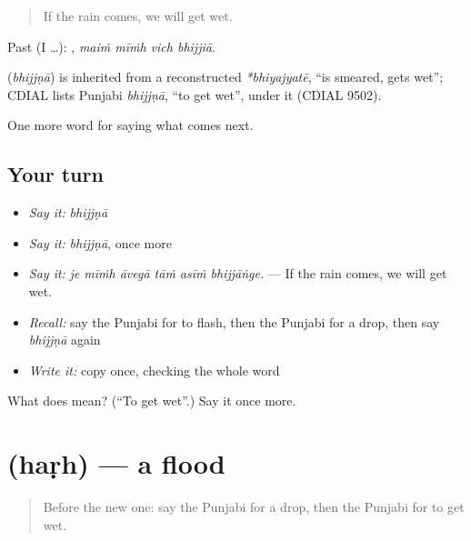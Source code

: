 \begin{quote}
If the rain comes, we will get wet.
\end{quote}

Past (I …):    , \emph{maiṁ mīṁh vich bhijjiā}.

\begin{cousinweb}
\textbf{} (\emph{bhijjṇā}) is inherited from a reconstructed \emph{*bhiyajyatē}, \textquotedblleft{}is smeared, gets wet\textquotedblright{}; CDIAL lists Punjabi \emph{bhijjṇā}, \textquotedblleft{}to get wet\textquotedblright{}, under it (CDIAL 9502).
\end{cousinweb}

\begin{grammarlens}[title={What you've built}]
One more word for saying what comes next.
\end{grammarlens}

\subsection*{Your turn}
\begin{itemize}
\raggedright
  \item \emph{Say it:} \emph{bhijjṇā}
  \item \emph{Say it:} \emph{bhijjṇā}, once more
  \item \emph{Say it:} \emph{je mīṁh āvegā tāṁ asīṁ bhijjāṅge.} — If the rain comes, we will get wet.
  \item \emph{Recall:} say the Punjabi for to flash, then the Punjabi for a drop, then say \emph{bhijjṇā} again
  \item \emph{Write it:} copy \textbf{} once, checking the whole word
\end{itemize}

\begin{tcolorbox}[breakable,colback=teal!4,colframe=teal!35!black,title={Before you move on}]
What does  mean? (\textquotedblleft{}To get wet\textquotedblright{}.) Say it once more.
\end{tcolorbox}
\section[\texorpdfstring{\pa{ਹੜ੍ਹ} (haṛh)}{ਹੜ੍ਹ (haṛh)}]{ (haṛh) — a flood}

\label{lesson:PA-C287-harh}



\begin{quote}
Before the new one: say the Punjabi for a drop, then the Punjabi for to get wet.
\end{quote}

